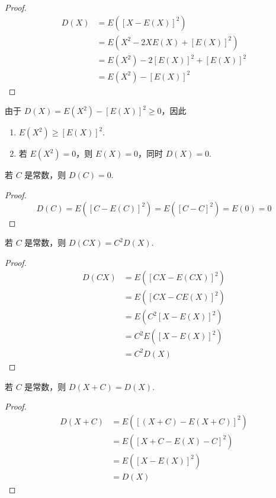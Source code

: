 \begin{proof}
    $$
    \begin{aligned}
        D(X) &= E([X-E(X)]^2) \\
        &= E(X^2 - 2XE(X) + [E(X)]^2) \\
        &= E(X^2) - 2[E(X)]^2 + [E(X)]^2 \\
        &= E(X^2) - [E(X)]^2
    \end{aligned}
    $$
\end{proof}

\begin{corollary}
    \indent 由于 $D(X) = E(X^2) - [E(X)]^2 \geqslant 0$，因此
    \begin{enumerate}
        \item $E(X^2) \geqslant [E(X)]^2$.
        \item 若 $E(X^2) = 0$，则 $E(X)=0$，同时 $D(X)=0$.
    \end{enumerate}
\end{corollary}

\begin{property}
    \indent 若 $C$ 是常数，则 $D(C) = 0$.
\end{property}

\begin{proof}
    $$
    D(C) = E([C-E(C)]^2) = E([C-C]^2) = E(0) = 0
    $$
\end{proof}

\begin{property}
    \indent 若 $C$ 是常数，则 $D(CX) = C^2 D(X)$.
\end{property}

\begin{proof}
    $$
    \begin{aligned}
        D(CX) &= E([CX - E(CX)]^2) \\
        &= E([CX - CE(X)]^2) \\
        &= E(C^2 [X-E(X)]^2) \\
        &= C^2 E([X-E(X)]^2) \\
        &= C^2 D(X)
    \end{aligned}
    $$
\end{proof}

\begin{property}
    \indent 若 $C$ 是常数，则 $D(X+C) = D(X)$.
\end{property}

\begin{proof}
    $$
    \begin{aligned}
        D(X+C) &= E([(X+C) - E(X+C)]^2) \\
        &= E([X + C - E(X) - C]^2) \\
        &= E([X-E(X)]^2) \\
        &= D(X)
    \end{aligned}
    $$
\end{proof}

